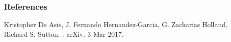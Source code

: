 \documentclass{beamer}
\begin{document}
\begin{frame}
  \frametitle<presentation>{References}

  \begin{thebibliography}{10}

  \beamertemplatebookbibitems

  \beamertemplatearticlebibitems

    Kristopher De Asis, J. Fernando Hernandez-Garcia, G. Zacharias Holland,
    Richard S. Sutton.
    .
    \newblock arXiv, 3 Mar 2017.

  \end{thebibliography}
\end{frame}
\end{document}
